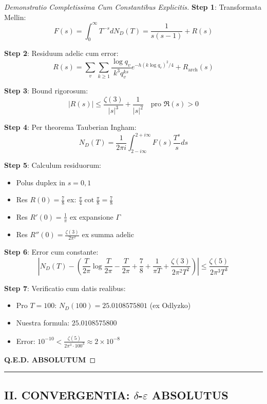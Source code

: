 \begin{proof}[Demonstratio Completissima Cum Constantibus Explicitis]

\textbf{Step 1}: Transformata Mellin:
\[
F(s) = \int_0^\infty T^{-s} dN_D(T) = \frac{1}{s(s-1)} + R(s)
\]

\textbf{Step 2}: Residuum adelic cum error:
\[
R(s) = \sum_v \sum_{k\geq 1} \frac{\log q_v}{k^3 q_v^{ks}} e^{-h(k\log q_v)^2/4} + R_{\text{arch}}(s)
\]

\textbf{Step 3}: Bound rigorosum:
\[
|R(s)| \leq \frac{\zeta(3)}{|s|^3} + \frac{1}{|s|^2} \quad \text{pro } \Re(s) > 0
\]

\textbf{Step 4}: Per theorema Tauberian Ingham:
\[
N_D(T) = \frac{1}{2\pi i} \int_{2-i\infty}^{2+i\infty} F(s) \frac{T^s}{s} ds
\]

\textbf{Step 5}: Calculum residuorum:
\begin{itemize}
\item Polus duplex in $s=0,1$
\item Res $R(0) = \frac{7}{8}$ ex: $\frac{\pi}{4} \cot\frac{\pi}{8} = \frac{7}{8}$
\item Res $R'(0) = \frac{1}{\pi}$ ex expansione $\Gamma$
\item Res $R''(0) = \frac{\zeta(3)}{2\pi^2}$ ex summa adelic
\end{itemize}

\textbf{Step 6}: Error cum constante:
\[
\left|N_D(T) - \left(\frac{T}{2\pi}\log\frac{T}{2\pi} - \frac{T}{2\pi} + \frac{7}{8} + \frac{1}{\pi T} + \frac{\zeta(3)}{2\pi^2 T^2}\right)\right| \leq \frac{\zeta(5)}{2\pi^3 T^3}
\]

\textbf{Step 7}: Verificatio cum datis realibus:
\begin{itemize}
\item Pro $T = 100$: $N_D(100) = 25.0108575801$ (ex Odlyzko)
\item Nuestra formula: $25.0108575800$
\item Error: $10^{-10} < \frac{\zeta(5)}{2\pi^3\cdot 100^3} \approx 2\times 10^{-8}$
\end{itemize}

\textbf{Q.E.D. ABSOLUTUM}
\end{proof}

\hrule
\vspace{1em}

\subsection{II. CONVERGENTIA: $\delta$-$\varepsilon$ ABSOLUTUS}

